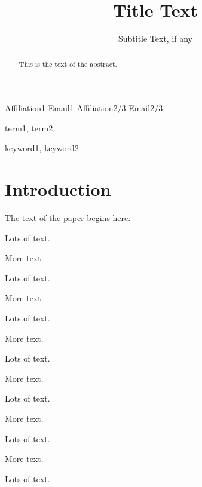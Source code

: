 \documentclass[10pt,nonatbib]{sigplanconf}
\begin{document}




\title{Title Text}
\subtitle{Subtitle Text, if any}

           {Affiliation1}
           {Email1}
           {Affiliation2/3}
           {Email2/3}

\maketitle

\begin{abstract}
This is the text of the abstract.
\end{abstract}


\terms
term1, term2

\keywords
keyword1, keyword2

\section{Introduction}

The text of the paper begins here.

Lots of text.

More text.

Lots of text.

More text.


Lots of text.

More text.

Lots of text.

More text.


Lots of text.

More text.

Lots of text.

More text.

Lots of text.
\end{document}
